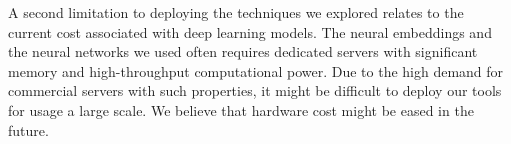 A second limitation to deploying the techniques we explored
relates to the current cost associated with deep learning models. 
The neural embeddings and the neural networks we used
 often requires dedicated servers with significant 
memory and high-throughput computational power.
 Due to the high demand for commercial servers with such properties, 
 it might be difficult to deploy our tools for usage a large scale.
We believe that hardware cost might be eased in the future.




